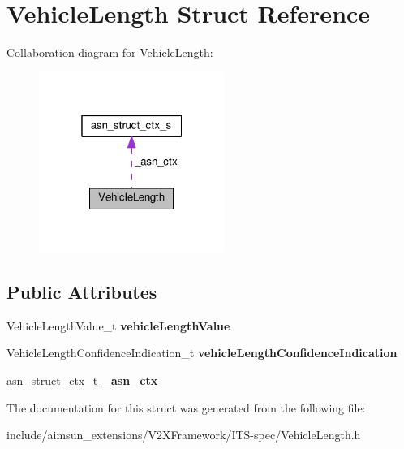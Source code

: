 \hypertarget{structVehicleLength}{}\section{Vehicle\+Length Struct Reference}
\label{structVehicleLength}


Collaboration diagram for Vehicle\+Length\+:\nopagebreak
\begin{figure}[H]
\begin{center}
\leavevmode
\includegraphics[width=172pt]{structVehicleLength__coll__graph}
\end{center}
\end{figure}
\subsection*{Public Attributes}
\begin{DoxyCompactItemize}
\item 
Vehicle\+Length\+Value\+\_\+t {\bfseries vehicle\+Length\+Value}\hypertarget{structVehicleLength_afbbf6bb9a35d30d09c221b46d877996c}{}\label{structVehicleLength_afbbf6bb9a35d30d09c221b46d877996c}

\item 
Vehicle\+Length\+Confidence\+Indication\+\_\+t {\bfseries vehicle\+Length\+Confidence\+Indication}\hypertarget{structVehicleLength_ac08080fc2362b4066027bc6fd2f45935}{}\label{structVehicleLength_ac08080fc2362b4066027bc6fd2f45935}

\item 
\hyperlink{structasn__struct__ctx__s}{asn\+\_\+struct\+\_\+ctx\+\_\+t} {\bfseries \+\_\+asn\+\_\+ctx}\hypertarget{structVehicleLength_a8b27f8ec63cd104a1abfebdfaaa50c3e}{}\label{structVehicleLength_a8b27f8ec63cd104a1abfebdfaaa50c3e}

\end{DoxyCompactItemize}


The documentation for this struct was generated from the following file\+:\begin{DoxyCompactItemize}
\item 
include/aimsun\+\_\+extensions/\+V2\+X\+Framework/\+I\+T\+S-\/spec/Vehicle\+Length.\+h\end{DoxyCompactItemize}
